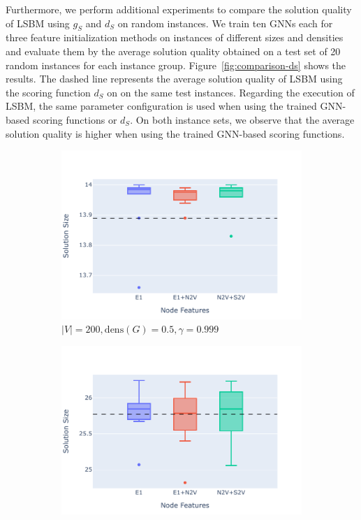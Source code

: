 \documentclass[draft,final]{vutinfth} %
\begin{document}
Furthermore, we perform additional experiments to compare the solution quality of LSBM using $g_S$ and $d_S$ on random instances. We train ten GNNs each for three feature initialization methods on instances of different sizes and densities and evaluate them by the average solution quality obtained on a test set of 20 random instances for each instance group. Figure~\ref{fig:comparison-ds} shows the results. The dashed line represents the average solution quality of LSBM using the scoring function $d_S$ on on the same test instances. Regarding the execution of LSBM, the same parameter configuration is used when using the trained GNN-based scoring functions or $d_S$. 
On both instance sets, we observe that the average solution quality is higher when using the trained GNN-based scoring functions. 

\begin{figure}
    \centering
    \begin{subfigure}{0.49\textwidth}
        \centering
        \includegraphics[width=\textwidth]{graphics/comparison-ds-1.pdf}
        \caption{$|V|=200, \mathrm{dens}(G)=0.5, \gamma=0.999$}
    \end{subfigure}
    \begin{subfigure}{0.49\textwidth}
        \centering
        \includegraphics[width=\textwidth]{graphics/comparison-ds-2.pdf}

\end{subfigure}
\end{figure}
\end{document}
